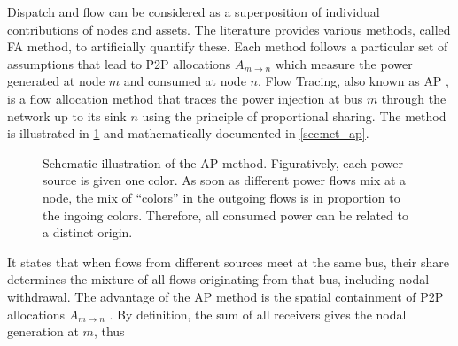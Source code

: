 \documentclass[11pt,twocolumn]{article}
\begin{document}
Dispatch and flow can be considered as a superposition of individual contributions of nodes and assets. The literature provides various methods, called \ac{FA} method, to artificially quantify these. Each method follows a particular set of assumptions that lead to \ac{P2P} allocations $A_{m \rightarrow n}$ which measure the power generated at node $m$ and consumed at node $n$. Flow Tracing, also known as \ac{AP} \cite{bialek_tracing_1996}, is a flow allocation method that traces the power injection at bus $m$ through the network up to its sink $n$ using the principle of proportional sharing. The method is illustrated in \cref{fig:ap-scheme} and mathematically documented in \cref{sec:net_ap}. 
\begin{figure}
    \centering
    \caption{Schematic illustration of the \ac{AP} method. Figuratively, each power source is given one color. As soon as different power flows mix at a node, the mix of ``colors'' in the outgoing flows is in proportion to the ingoing colors. Therefore, all consumed power can be related to a distinct origin.}
    \label{fig:ap-scheme}
\end{figure}
It states that when flows from different sources meet at the same bus, their share determines the mixture of all flows originating from that bus, including nodal withdrawal. The advantage of the \ac{AP} method is the spatial containment of \ac{P2P} allocations $A_{m \rightarrow n}$ \cite{hofmann_techno-economic_2020}. By definition, the sum of all receivers gives the nodal generation at $m$, thus
\end{document}
